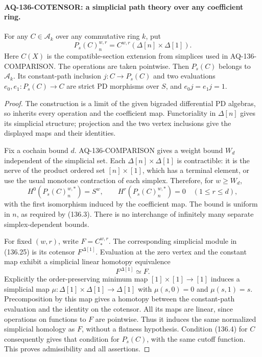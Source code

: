 \paragraph{AQ-136-COTENSOR: a simplicial path theory over any coefficient ring.}
For any $C\in\mathcal A_k$ over any commutative ring $k$, put
\[
 P_s(C)_n^{w,r}=C^{w,r}(\Delta[n]\times\Delta[1]).             \tag{136.25}
\]
Here $C(X)$ is the compatible-section extension from simplices
used in AQ-136-COMPARISON.  The operations are taken pointwise.
Then $P_s(C)$ belongs to $\mathcal A_k$.  Its constant-path
inclusion $j:C\to P_s(C)$ and two evaluations
$e_0,e_1:P_s(C)\to C$ are strict PD morphisms over $S$,
and $e_0j=e_1j=1$.

\begin{proof}
The construction is a limit of the given bigraded differential
PD algebras, so inherits every operation and the coefficient
map.  Functoriality in $\Delta[n]$ gives its simplicial
structure; projection and the two vertex inclusions give
the displayed maps and their identities.

Fix a cochain bound $d$.  AQ-136-COMPARISON gives a weight
bound $W_d$ independent of the simplicial set.  Each
$\Delta[n]\times\Delta[1]$ is contractible: it is the nerve
of the product ordered set $[n]\times[1]$, which has a
terminal element, or use the usual monotone contraction of
each simplex.  Therefore, for $w\geq W_d$,
\[
 H^0(P_s(C)_n^{w,*})=S^w,\qquad
 H^r(P_s(C)_n^{w,*})=0\quad(1\leq r\leq d),                \tag{136.26}
\]
with the first isomorphism induced by the coefficient map.
The bound is uniform in $n$, as required by (136.3).
There is no interchange of infinitely many separate
simplex-dependent bounds.

For fixed $(w,r)$, write $F=C_*^{w,r}$.  The corresponding
simplicial module in (136.25) is its cotensor
$F^{\Delta[1]}$.  Evaluation at the zero vertex and the
constant map exhibit a simplicial linear homotopy
equivalence
\[
                       F^{\Delta[1]}\simeq F.              \tag{136.27}
\]
Explicitly the order-preserving minimum map
$[1]\times[1]\to[1]$ induces a simplicial map
$\mu:\Delta[1]\times\Delta[1]\to\Delta[1]$
with $\mu(s,0)=0$ and $\mu(s,1)=s$.
Precomposition by this map gives a homotopy between the
constant-path evaluation and the identity on the cotensor.
All its maps are linear, since operations on functions to
$F$ are pointwise.  Thus it induces the same normalized
simplicial homology as $F$, without a flatness hypothesis.
Condition (136.4) for $C$ consequently gives that condition
for $P_s(C)$, with the same cutoff function.  This proves
admissibility and all assertions.
\end{proof}


